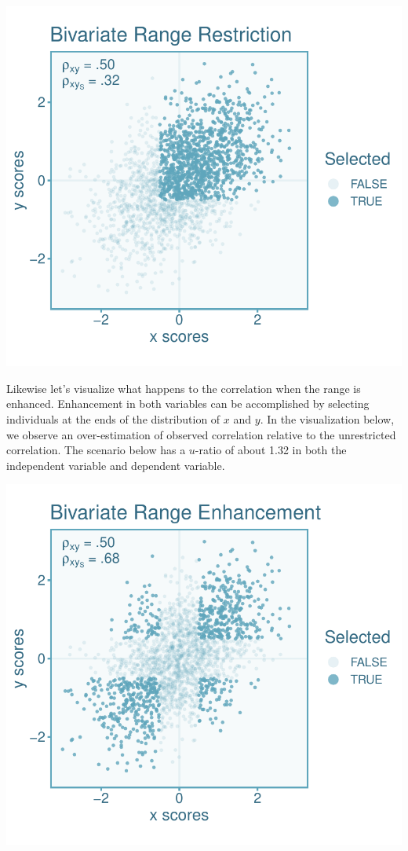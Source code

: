 \documentclass[
  letterpaper,
  DIV=11,
  numbers=noendperiod]{scrreprt}
\begin{document}
\includegraphics{direct_range_restriction_files/figure-pdf/unnamed-chunk-4-1.pdf}

Likewise let's visualize what happens to the correlation when the range
is enhanced. Enhancement in both variables can be accomplished by
selecting individuals at the ends of the distribution of \(x\) and
\(y\). In the visualization below, we observe an over-estimation of
observed correlation relative to the unrestricted correlation. The
scenario below has a \(u\)-ratio of about 1.32 in both the independent
variable and dependent variable.

\includegraphics{direct_range_restriction_files/figure-pdf/unnamed-chunk-5-1.pdf}
\end{document}
